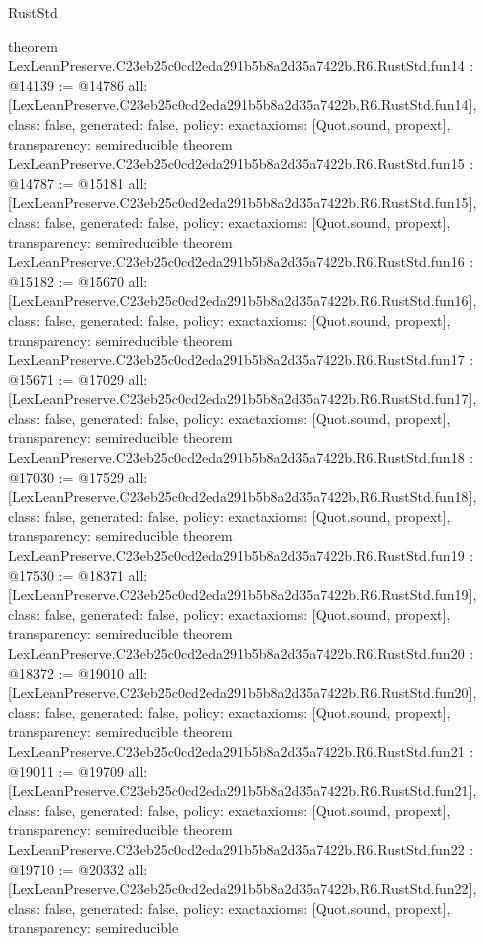 \begin{lexlean}{RustStd}
\begin{coremodule}
{}
theorem LexLeanPreserve.C23eb25c0cd2eda291b5b8a2d35a7422b.R6.RustStd.fun14 : @14139 := @14786 {
  all: [LexLeanPreserve.C23eb25c0cd2eda291b5b8a2d35a7422b.R6.RustStd.fun14],
  class: false,
  generated: false,
  policy: exact{axioms: [Quot.sound, propext]},
  transparency: semireducible
}
theorem LexLeanPreserve.C23eb25c0cd2eda291b5b8a2d35a7422b.R6.RustStd.fun15 : @14787 := @15181 {
  all: [LexLeanPreserve.C23eb25c0cd2eda291b5b8a2d35a7422b.R6.RustStd.fun15],
  class: false,
  generated: false,
  policy: exact{axioms: [Quot.sound, propext]},
  transparency: semireducible
}
theorem LexLeanPreserve.C23eb25c0cd2eda291b5b8a2d35a7422b.R6.RustStd.fun16 : @15182 := @15670 {
  all: [LexLeanPreserve.C23eb25c0cd2eda291b5b8a2d35a7422b.R6.RustStd.fun16],
  class: false,
  generated: false,
  policy: exact{axioms: [Quot.sound, propext]},
  transparency: semireducible
}
theorem LexLeanPreserve.C23eb25c0cd2eda291b5b8a2d35a7422b.R6.RustStd.fun17 : @15671 := @17029 {
  all: [LexLeanPreserve.C23eb25c0cd2eda291b5b8a2d35a7422b.R6.RustStd.fun17],
  class: false,
  generated: false,
  policy: exact{axioms: [Quot.sound, propext]},
  transparency: semireducible
}
theorem LexLeanPreserve.C23eb25c0cd2eda291b5b8a2d35a7422b.R6.RustStd.fun18 : @17030 := @17529 {
  all: [LexLeanPreserve.C23eb25c0cd2eda291b5b8a2d35a7422b.R6.RustStd.fun18],
  class: false,
  generated: false,
  policy: exact{axioms: [Quot.sound, propext]},
  transparency: semireducible
}
theorem LexLeanPreserve.C23eb25c0cd2eda291b5b8a2d35a7422b.R6.RustStd.fun19 : @17530 := @18371 {
  all: [LexLeanPreserve.C23eb25c0cd2eda291b5b8a2d35a7422b.R6.RustStd.fun19],
  class: false,
  generated: false,
  policy: exact{axioms: [Quot.sound, propext]},
  transparency: semireducible
}
theorem LexLeanPreserve.C23eb25c0cd2eda291b5b8a2d35a7422b.R6.RustStd.fun20 : @18372 := @19010 {
  all: [LexLeanPreserve.C23eb25c0cd2eda291b5b8a2d35a7422b.R6.RustStd.fun20],
  class: false,
  generated: false,
  policy: exact{axioms: [Quot.sound, propext]},
  transparency: semireducible
}
theorem LexLeanPreserve.C23eb25c0cd2eda291b5b8a2d35a7422b.R6.RustStd.fun21 : @19011 := @19709 {
  all: [LexLeanPreserve.C23eb25c0cd2eda291b5b8a2d35a7422b.R6.RustStd.fun21],
  class: false,
  generated: false,
  policy: exact{axioms: [Quot.sound, propext]},
  transparency: semireducible
}
theorem LexLeanPreserve.C23eb25c0cd2eda291b5b8a2d35a7422b.R6.RustStd.fun22 : @19710 := @20332 {
  all: [LexLeanPreserve.C23eb25c0cd2eda291b5b8a2d35a7422b.R6.RustStd.fun22],
  class: false,
  generated: false,
  policy: exact{axioms: [Quot.sound, propext]},
  transparency: semireducible
}
\end{coremodule}
\end{lexlean}
